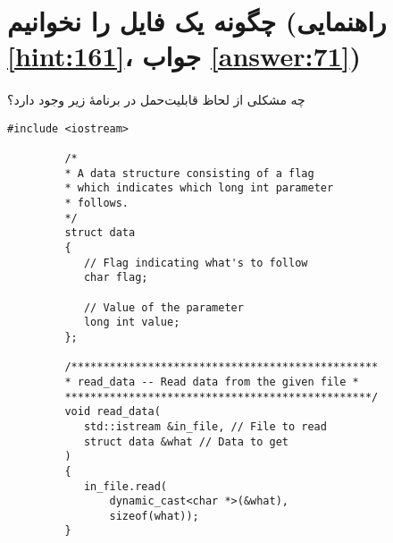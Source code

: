 \section[چگونه یک فایل را نخوانیم]{چگونه یک فایل را نخوانیم \protect{} (راهنمایی \ref{hint:161}، جواب \ref{answer:71})}
\paragraph{}\label{prog:57}
چه مشکلی از لحاظ قابلیت‌حمل در برنامهٔ زیر وجود دارد؟

\begin{LTR}
    \begin{lstlisting}[style=C++Style]
         #include <iostream>

         /*
         * A data structure consisting of a flag
         * which indicates which long int parameter
         * follows.
         */
         struct data
         {
         	// Flag indicating what's to follow
         	char flag;

         	// Value of the parameter
         	long int value;
         };

         /************************************************
         * read_data -- Read data from the given file *
         ************************************************/
         void read_data(
         	std::istream &in_file, // File to read
         	struct data &what // Data to get
         )
         {
         	in_file.read(
         		dynamic_cast<char *>(&what),
         		sizeof(what));
         }
    \end{lstlisting}
\end{LTR}